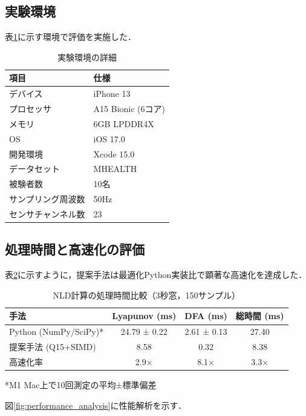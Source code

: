 \documentclass[paper]{ieicej}
\begin{document}
\subsection{実験環境}

表\ref{tab:environment}に示す環境で評価を実施した．

\begin{table}[t]
\caption{実験環境の詳細}
\label{tab:environment}
\centering
\begin{tabular}{ll}
\toprule
項目 & 仕様 \\
\midrule
デバイス & iPhone 13 \\
プロセッサ & A15 Bionic (6コア) \\
メモリ & 6GB LPDDR4X \\
OS & iOS 17.0 \\
開発環境 & Xcode 15.0 \\
データセット & MHEALTH\cite{banos2014} \\
被験者数 & 10名 \\
サンプリング周波数 & 50Hz \\
センサチャンネル数 & 23 \\
\bottomrule
\end{tabular}
\end{table}

\subsection{処理時間と高速化の評価}

表\ref{tab:performance}に示すように，提案手法は最適化Python実装比で顕著な高速化を達成した．

\begin{table}[t]
\caption{NLD計算の処理時間比較（3秒窓，150サンプル）}
\label{tab:performance}
\centering
\begin{tabular}{lccc}
\toprule
手法 & Lyapunov (ms) & DFA (ms) & 総時間 (ms) \\
\midrule
Python (NumPy/SciPy)* & 24.79 ± 0.22 & 2.61 ± 0.13 & 27.40 \\
提案手法 (Q15+SIMD) & 8.58 & 0.32 & 8.38 \\
\midrule
高速化率 & 2.9× & 8.1× & 3.3× \\
\bottomrule
\end{tabular}
\vspace{1mm}
\footnotesize{*M1 Mac上で10回測定の平均±標準偏差}
\end{table}

図\ref{fig:performance_analysis}に性能解析を示す．
\end{document}
